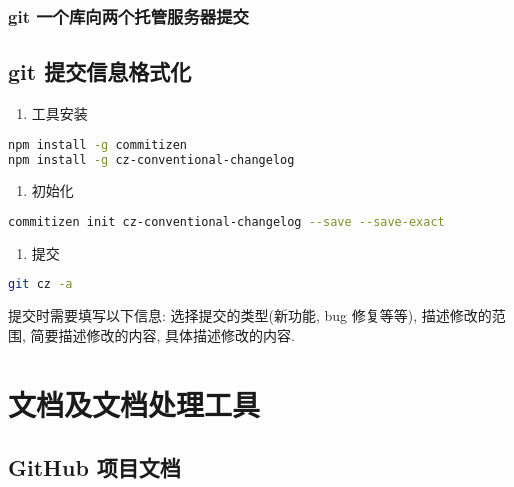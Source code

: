 \subsubsection{git
一个库向两个托管服务器提交}\label{git-ux4e00ux4e2aux5e93ux5411ux4e24ux4e2aux6258ux7ba1ux670dux52a1ux5668ux63d0ux4ea4}

\subsection{git
提交信息格式化}\label{git-ux63d0ux4ea4ux4fe1ux606fux683cux5f0fux5316}

\begin{enumerate}
\def\labelenumi{\arabic{enumi}.}
\tightlist
\item
  工具安装
\end{enumerate}

\begin{lstlisting}[language=bash]
npm install -g commitizen
npm install -g cz-conventional-changelog
\end{lstlisting}

\begin{enumerate}
\def\labelenumi{\arabic{enumi}.}
\setcounter{enumi}{1}
\tightlist
\item
  初始化
\end{enumerate}

\begin{lstlisting}[language=bash]
commitizen init cz-conventional-changelog --save --save-exact
\end{lstlisting}

\begin{enumerate}
\def\labelenumi{\arabic{enumi}.}
\setcounter{enumi}{2}
\tightlist
\item
  提交
\end{enumerate}

\begin{lstlisting}[language=bash]
git cz -a
\end{lstlisting}

提交时需要填写以下信息: 选择提交的类型(新功能, bug 修复等等),
描述修改的范围, 简要描述修改的内容, 具体描述修改的内容.

\section{文档及文档处理工具}\label{ux6587ux6863ux53caux6587ux6863ux5904ux7406ux5de5ux5177}

\subsection{GitHub 项目文档}\label{github-ux9879ux76eeux6587ux6863}

